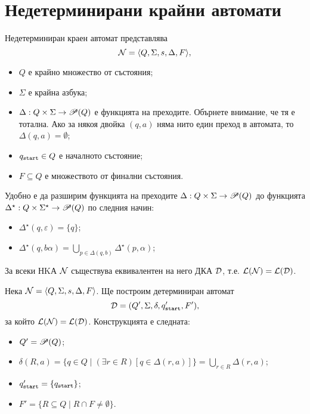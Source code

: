 \section{Недетерминирани крайни автомати}
\begin{dfn}
  Недетерминиран краен автомат представлява
  \[\mathcal{N} = \langle{Q,\Sigma,s,\Delta,F}\rangle,\]
  \begin{itemize}
  \item
    $Q$ е крайно множество от състояния;
  \item
    $\Sigma$ е крайна азбука;
  \item
    $\Delta: Q\times\Sigma \to \mathscr{P}(Q)$ е функцията на преходите.
    Обърнете внимание, че тя е тотална.
    Ако за някоя двойка $(q,a)$ няма нито един преход в автомата, то 
    $\Delta(q,a) = \emptyset$;
  \item
    $q_{\texttt{start}} \in Q$ е началното състояние;
  \item
    $F\subseteq Q$ е множеството от финални състояния.
  \end{itemize}
\end{dfn}

Удобно е да разширим функцията на преходите $\Delta: Q\times\Sigma \to \mathscr{P}(Q)$ 
до функцията $\Delta^\star: Q\times\Sigma^\star \to \mathscr{P}(Q)$ по следния начин:
\begin{itemize}
\item 
  $\Delta^\star(q, \varepsilon) = \{q\}$;
\item
  $\Delta^\star(q, b\alpha) = \bigcup_{p \in \Delta(q,b)} \Delta^\star(p, \alpha)$;
\end{itemize}

\begin{framed}
\begin{thm}
  За всеки НKА $\mathcal{N}$ съществува еквивалентен на него ДКА $\mathcal{D}$, т.е. $\mathcal{L}(\mathcal{N}) = \mathcal{L}(\mathcal{D})$.
\end{thm}
\end{framed}
\begin{hint}
  Нека $\mathcal{N} = \langle{Q,\Sigma,s,\Delta,F}\rangle$. Ще построим детерминиран автомат
  \[\mathcal{D} = (Q',\Sigma,\delta,q_{\texttt{start}}',F'),\]
  за който $\mathcal{L}(\mathcal{N}) = \mathcal{L}(\mathcal{D})$.
  Конструкцията е следната:
  \begin{itemize}
  \item
    $Q' = \mathscr{P}(Q)$;
  \item
    $\delta(R,a) = \{q\in Q\mid (\exists r\in R)[q\in\Delta(r,a)]\} = \bigcup_{r\in R}\Delta(r,a)$;
  \item
    $q_{\texttt{start}}' = \{q_{\texttt{start}}\}$;
  \item
    $F' = \{R \subseteq Q \mid R\cap F \neq \emptyset\}$.
  \end{itemize}
\end{hint}

